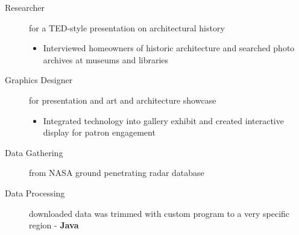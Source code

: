 \documentclass[a4paper]{deedy-resume} %
\begin{document}
    \begin{description}
    \item[Researcher] for a TED-style presentation on architectural history 
    
    \iftrue

    \begin{itemize}
        \item Interviewed homeowners of historic architecture and searched photo archives at museums and libraries
    \end{itemize}

    \fi

    \item[Graphics Designer] for presentation and art and architecture showcase
    
    \iftrue

    \begin{itemize}
        \item Integrated technology into gallery exhibit and created interactive display for patron engagement
    \end{itemize}

    \fi
    \end{description}
    
    
        
    \iftrue

    \begin{description}
        \item[Data Gathering] from NASA ground penetrating radar database 
        \item[Data Processing] downloaded data was trimmed with custom program to a very specific region - \textbf{Java}
    \end{description}
    \fi


    
    \iffalse
\end{document}

